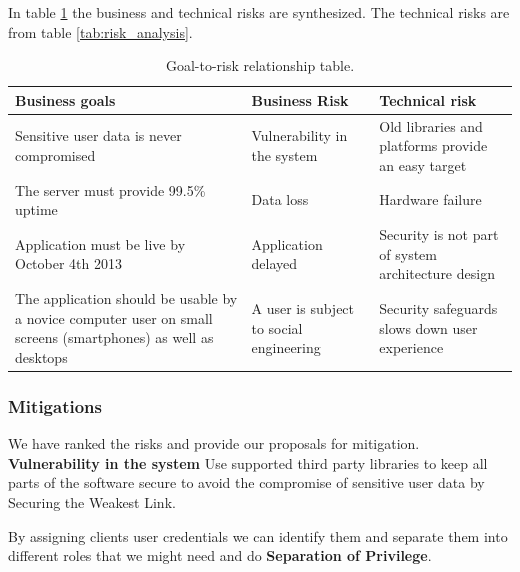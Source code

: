 \documentclass[a4paper]{article}
\begin{document}
In table \ref{tab:goal_to_risk_relationship} the business and technical risks are synthesized. The technical risks are from table \ref{tab:risk_analysis}.
\sffamily
\begin{table}[h!]
	\begin{tabular}{| p{4cm} | p{4cm}| p{4cm} |}
    \hline
   	\textbf{Business goals} & \textbf{Business Risk} & \textbf{Technical risk} \\ \hline
	Sensitive user data is never compromised & Vulnerability in the system & Old libraries and platforms provide an easy target \\ \hline
    The server must provide 99.5\% uptime & Data loss &  Hardware failure \\ \hline
    Application must be live by October 4th 2013 & Application delayed &  Security is not part of system architecture design \\ \hline
    The application should be usable by a novice computer user on small screens (smartphones) as well as desktops & A user is subject to social engineering & Security safeguards slows down user experience \\ \hline
    \end{tabular}
    \caption{Goal-to-risk relationship table.}
	\label{tab:goal_to_risk_relationship}
\end{table}

\rmfamily

\subsubsection{Mitigations}
We have ranked the risks and provide our proposals for mitigation.
\textbf{Vulnerability in the system}
Use supported third party libraries to keep all parts of the software secure to avoid the compromise of sensitive user data by Securing the Weakest Link.


By assigning clients user credentials we can identify them and separate them into different roles that we might need and do \textbf{Separation of Privilege}.
\end{document}

